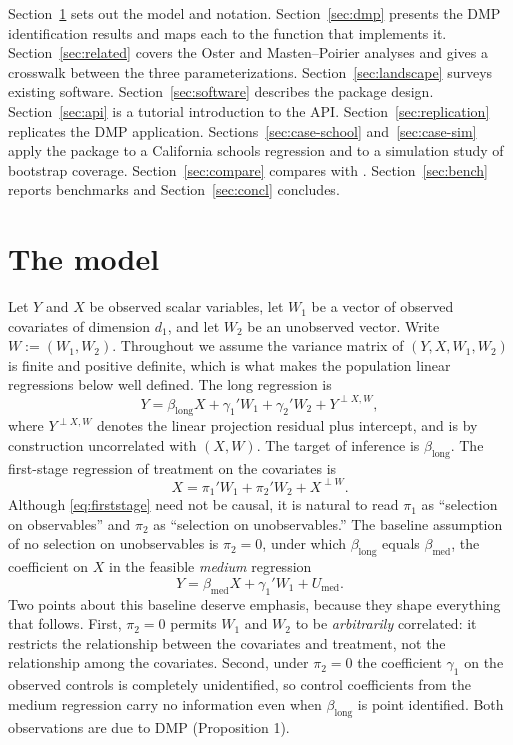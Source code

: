 \documentclass[article]{jss}\usepackage[]{graphicx}\usepackage[]{xcolor}
\newcommand{\blong}{\beta_{\mathrm{long}}}
\newcommand{\bmed}{\beta_{\mathrm{med}}}
\begin{document}
Section~\ref{sec:model} sets out the model and notation.
Section~\ref{sec:dmp} presents the DMP identification results and maps each
to the function that implements it. Section~\ref{sec:related} covers the
Oster and Masten--Poirier analyses and gives a crosswalk between the three
parameterizations. Section~\ref{sec:landscape} surveys existing software.
Section~\ref{sec:software} describes the package design.
Section~\ref{sec:api} is a tutorial introduction to the API.
Section~\ref{sec:replication} replicates the DMP application.
Sections~\ref{sec:case-school} and~\ref{sec:case-sim} apply the package to
a California schools regression and to a simulation study of bootstrap
coverage. Section~\ref{sec:compare} compares with .
Section~\ref{sec:bench} reports benchmarks and
Section~\ref{sec:concl} concludes.

\section{The model}\label{sec:model}

Let $Y$ and $X$ be observed scalar variables, let $W_1$ be a vector of
observed covariates of dimension $d_1$, and let $W_2$ be an unobserved
vector. Write $W := (W_1, W_2)$. Throughout we assume the variance matrix
of $(Y, X, W_1, W_2)$ is finite and positive definite, which is what makes
the population linear regressions below well defined. The long regression
is
\begin{equation}
Y = \blong X + \gamma_1' W_1 + \gamma_2' W_2 + Y^{\perp X, W},
\label{eq:longreg}
\end{equation}
where $Y^{\perp X,W}$ denotes the linear projection residual plus
intercept, and is by construction uncorrelated with $(X, W)$. The target of
inference is $\blong$. The first-stage regression of treatment on the
covariates is
\begin{equation}
X = \pi_1' W_1 + \pi_2' W_2 + X^{\perp W}.
\label{eq:firststage}
\end{equation}
Although \eqref{eq:firststage} need not be causal, it is natural to read
$\pi_1$ as ``selection on observables'' and $\pi_2$ as ``selection on
unobservables.'' The baseline assumption of no selection on unobservables
is $\pi_2 = 0$, under which $\blong$ equals $\bmed$, the coefficient on $X$
in the feasible \emph{medium} regression
\begin{equation}
Y = \bmed X + \gamma_1' W_1 + U_{\mathrm{med}}.
\label{eq:medreg}
\end{equation}
Two points about this baseline deserve emphasis, because they shape
everything that follows. First, $\pi_2 = 0$ permits $W_1$ and $W_2$ to be
\emph{arbitrarily} correlated: it restricts the relationship between the
covariates and treatment, not the relationship among the covariates.
Second, under $\pi_2 = 0$ the coefficient $\gamma_1$ on the observed
controls is completely unidentified, so control coefficients from the
medium regression carry no information even when $\blong$ is point
identified. Both observations are due to DMP (Proposition 1).
\end{document}
